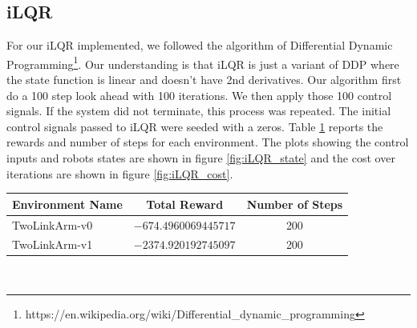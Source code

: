 \documentclass[hidelinks]{scrartcl}
\begin{document}
\subsection*{iLQR}
For our iLQR implemented, we followed the algorithm of Differential Dynamic Programming\footnote{https://en.wikipedia.org/wiki/Differential_dynamic_programming}. Our understanding is that iLQR is just a variant of DDP where the state function is linear and doesn't have 2nd derivatives. Our algorithm first do a 100 step look ahead with 100 iterations. We then apply those 100 control signals. If the system did not terminate, this process was repeated. The initial control signals passed to iLQR were seeded with a zeros. Table \ref{table:iLQR_performance} reports the rewards and number of steps for each environment. The plots showing the control inputs and robots states are shown in figure \ref{fig:iLQR_state} and the cost over iterations are shown in figure \ref{fig:iLQR_cost}.
\begin{table}[h]
  \centering
  \begin{tabular}{|l|c|c|}
    \hline  
    Environment Name & Total Reward & Number of Steps\\
    \hline
    TwoLinkArm-v0 & $-674.4960069445717$ & 200 \\ 
    TwoLinkArm-v1 & $-2374.920192745097$ & 200 \\
    \hline
  \end{tabular}
  \\
  \label{table:iLQR_performance}
\end{table}
\end{document}
